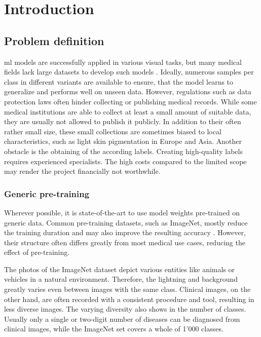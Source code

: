 \chapter{Introduction}\label{chapter_1}

\section{Problem definition}

\gls{ml} models are successfully applied in various visual tasks, but many medical fields lack large datasets to develop such models \autocite{castro2019}. 
Ideally, numerous samples per class in different variants are available to ensure, that the model learns to generalize and performs well on unseen data. 
However, regulations such as data protection laws often hinder collecting or publishing medical records. 
While some medical institutions are able to collect at least a small amount of suitable data, they are usually not allowed to publish it publicly. 
In addition to their often rather small size, these small collections are sometimes biased to local characteristics, such as light skin pigmentation in Europe and Asia.
Another obstacle is the obtaining of the according labels. Creating high-quality labels requires experienced specialists. 
The high costs compared to the limited scope may render the project financially not worthwhile.

\subsection{Generic pre-training}
Wherever possible, it is state-of-the-art to use model weights pre-trained on generic data. 
Common pre-training datasets, such as ImageNet, mostly reduce the training duration and may also improve the resulting accuracy \autocite{deng2009}.
However, their structure often differs greatly from most medical use cases, reducing the effect of pre-training. 

The photos of the ImageNet dataset depict various entities like animals or vehicles in a natural environment. 
Therefore, the lightning and background greatly varies even between images with the same class.
Clinical images, on the other hand, are often recorded with a consistent procedure and tool, resulting in less diverse images.
The varying diversity also shows in the number of classes. 
Usually only a single or two-digit number of diseases can be diagnosed from clinical images, while the ImageNet set covers a whole of 1'000 classes.

